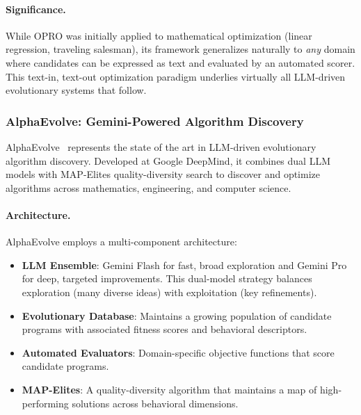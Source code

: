 \paragraph{Significance.}
While OPRO was initially applied to mathematical optimization (linear regression, traveling salesman), its framework generalizes naturally to \emph{any} domain where candidates can be expressed as text and evaluated by an automated scorer. This text-in, text-out optimization paradigm underlies virtually all LLM-driven evolutionary systems that follow.

\subsubsection{AlphaEvolve: Gemini-Powered Algorithm Discovery}
\label{sec:alphaevolve}

AlphaEvolve~\citep{novikov2025alphaevolve} represents the state of the art in LLM-driven evolutionary algorithm discovery. Developed at Google DeepMind, it combines dual LLM models with MAP-Elites quality-diversity search to discover and optimize algorithms across mathematics, engineering, and computer science.

\paragraph{Architecture.}
AlphaEvolve employs a multi-component architecture:
\begin{itemize}
    \item \textbf{LLM Ensemble}: Gemini Flash for fast, broad exploration and Gemini Pro for deep, targeted improvements. This dual-model strategy balances exploration (many diverse ideas) with exploitation (key refinements).
    \item \textbf{Evolutionary Database}: Maintains a growing population of candidate programs with associated fitness scores and behavioral descriptors.
    \item \textbf{Automated Evaluators}: Domain-specific objective functions that score candidate programs.
    \item \textbf{MAP-Elites}: A quality-diversity algorithm that maintains a map of high-performing solutions across behavioral dimensions.
\end{itemize}

